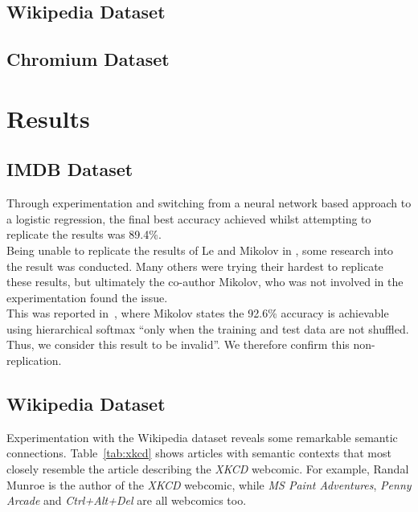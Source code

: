 \documentclass[11pt]{article}
\begin{document}
\subsection*{Wikipedia Dataset}

\subsection*{Chromium Dataset}


\section*{Results}

\subsection*{IMDB Dataset}

Through experimentation and switching from a neural network
based approach to a logistic regression, the final best accuracy
achieved whilst attempting to replicate the results was 89.4\%.\\
Being unable to replicate the results of Le and Mikolov in
\cite{le2014distributed}, some research into the result was
conducted. Many others were trying their hardest to replicate these
results, but ultimately the co-author Mikolov, who was not involved
in the experimentation found the issue.\\
This was reported in~\cite{mesnil2014ensemble}, where Mikolov
states the 92.6\% accuracy is achievable using hierarchical softmax
``only when the training and test data are not shuffled. Thus, we
consider this result to be invalid''. We therefore confirm this
non-replication.

\subsection*{Wikipedia Dataset}

Experimentation with the Wikipedia dataset reveals some remarkable semantic connections. Table~\ref{tab:xkcd} shows articles with semantic contexts that most closely resemble the article describing the \emph{XKCD} webcomic. For example, Randal Munroe is the author of the \emph{XKCD} webcomic, while \emph{MS Paint Adventures}, \emph{Penny Arcade} and \emph{Ctrl+Alt+Del} are all webcomics too.
\end{document}
